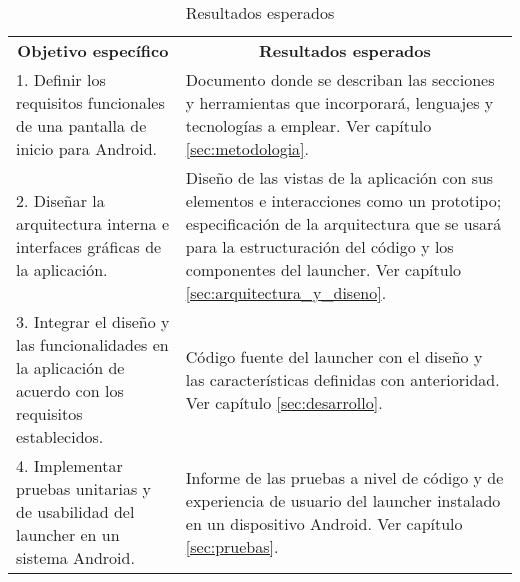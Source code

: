 \begin{table}[H]
\caption{Resultados esperados}
\begin{tabular*}{\textwidth}{|p{}|p{}|}
\cline{1-2}
\multicolumn{1}{|c|}{\cellcolor[gray]{0.9} \textbf{Objetivo específico}} &  \multicolumn{1}{|c|}{\cellcolor[gray]{0.9} \textbf{Resultados esperados}}  \\
\cline{1-2}
1. Definir los requisitos funcionales de una pantalla de inicio para Android. & 
Documento donde se describan las secciones y herramientas que incorporará, lenguajes y tecnologías a emplear. Ver capítulo \ref{sec:metodologia}.
\\
\cline{1-2} 

2. Diseñar la arquitectura interna e interfaces gráficas de la aplicación. & 
Diseño de las vistas de la aplicación con sus elementos e interacciones como un prototipo; especificación de la arquitectura que se usará para la estructuración del código y los componentes del launcher. Ver capítulo \ref{sec:arquitectura_y_diseno}.
\\

\cline{1-2} 

3. Integrar el diseño y las funcionalidades en la aplicación de acuerdo con los requisitos establecidos. & 
Código fuente del launcher con el diseño y las características definidas con anterioridad. Ver capítulo \ref{sec:desarrollo}. \\

\cline{1-2} 

4. Implementar pruebas unitarias y de usabilidad del launcher en un sistema Android. & 
Informe de las pruebas a nivel de código y de experiencia de usuario del launcher instalado en un dispositivo Android. Ver capítulo \ref{sec:pruebas}. \\

\cline{1-2} 

\end{tabular*}
\end{table}





